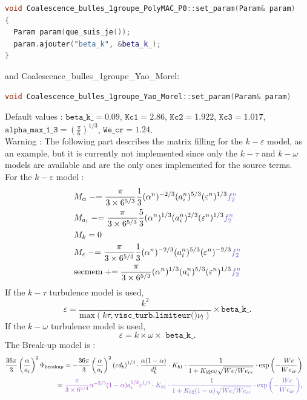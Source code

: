 \begin{lstlisting}[language=c++]
void Coalescence_bulles_1groupe_PolyMAC_P0::set_param(Param& param)
{
  Param param(que_suis_je());
  param.ajouter("beta_k", &beta_k_);
}
\end{lstlisting}
and {\color{myslateblue} Coalescence_bulles_1groupe_Yao_Morel}:
\begin{lstlisting}[language=c++]
void Coalescence_bulles_1groupe_Yao_Morel::set_param(Param& param)
\end{lstlisting}
Default values : $\texttt{beta\_k\_} = 0.09$, $\texttt{Kc1} = 2.86$, $\texttt{Kc2} = 1.922$, $\texttt{Kc3} = 1.017$,
$\texttt{alpha\_max\_1\_3} = (\frac{\pi}{6})^{1/3}$, $\texttt{We\_cr} = 1.24$.\\
{\color{red} Warning} : The following part describes the matrix filling for the $k-\varepsilon$ model, as an example, but it is currently not implemented since only the $k-\tau$ and $k-\omega$ models are available and are the only ones implemented for the source terms.\\
For the $k-\varepsilon$ model : 
\begin{align}
    &M_{\alpha} \minuseq \frac{\pi}{3\times 6^{5/3}}\frac{1}{3}(\alpha^n)^{-2/3}(a_i^n)^{5/3}(\varepsilon^n)^{1/3} {\color{myslateblue} f_2^n}\\
    &M_{a_i} \minuseq \frac{\pi}{3\times 6^{5/3}}\frac{5}{3}(\alpha^n)^{1/3}(a_i^n)^{2/3}(\varepsilon^n)^{1/3} {\color{myslateblue} f_2^n}\\
    &M_{k}=0\\
    &M_{\varepsilon} \minuseq \frac{\pi}{3\times 6^{5/3}}\frac{1}{3}(\alpha^n)^{-2/3}(a_i^n)^{5/3}(\varepsilon^n)^{-2/3} {\color{myslateblue} f_2^n}\\
    &\text{secmem} \pluseq \frac{\pi}{3\times 6^{5/3}}(\alpha^n)^{1/3}(a_i^n)^{5/3}(\varepsilon^n)^{1/3} {\color{myslateblue} f_2^n}
\end{align}
If the $k-\tau$ turbulence model is used, 
\begin{equation}
\varepsilon = \frac{k^2}{\text{max}(k\tau, \texttt{visc\_turb.limiteur()} \nu_l)}\times \texttt{beta\_k\_}.
\end{equation}
If the $k-\omega$ turbulence model is used, 
\begin{equation}
\varepsilon = k \times \omega \times\texttt{ beta\_k\_}.
\end{equation}
The {\colorbox{codebackground}{\color{codekeyword3}  Break-up}} model is : 
\begin{equation}
\begin{aligned}
		\frac{36\pi}{3}\parent{\frac{\alpha}{a_i}}^2\Phi_{\text{breakup}} =- \frac{36\pi}{3}\parent{\frac{\alpha}{a_i}}^2 \parent{\varepsilon d_b}^{1/3} \cdot \frac{\alpha(1-\alpha)}{d_b^4} \cdot K_{b1} \cdot \frac{1}{1 + K_{b2}\alpha_l \sqrt{We/We_{cr}}} \cdot \text{exp}\left(- \frac{We}{We_{cr}}\right)& & \\ = {\color{mydarkorchid} \frac{\pi}{3\times 6^{5/3}}\alpha^{-2/3}(1-\alpha)a_i^{5/3}\varepsilon^{1/3}} \cdot {\color{myslateblue} K_{b1} \cdot \frac{1}{1 + K_{b2}(1-\alpha) \sqrt{We/We_{cr}}} \cdot \text{exp}\left(- \frac{We}{We_{cr}}\right)},
\end{aligned}
\end{equation}
